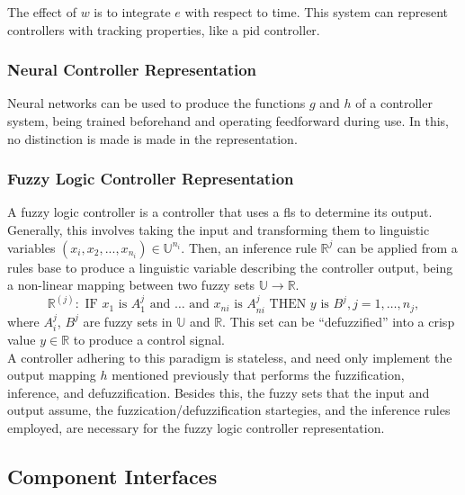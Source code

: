 The effect of $w$ is to integrate $e$ with respect to time. This system can represent controllers with tracking
properties, like a \acrshort{pid} controller.

\subsubsection{Neural Controller Representation}\label{sec:nnc}

Neural networks can be used to produce the functions $g$ and $h$ of a controller system, being trained 
beforehand and operating feedforward during use. In this, no distinction is made is made in the representation. \\

\subsubsection{Fuzzy Logic Controller Representation}\label{sec:flc}

A fuzzy logic controller is a controller that uses a \acrlong{fls} to determine its output. Generally, this involves 
taking the input and transforming them to linguistic variables $(x_i, x_2, ..., x_{n_i}) \in \mathbb U^{n_i}$. Then, 
an inference rule $\mathbb R^j$ can be applied from a rules base to produce a linguistic variable describing 
the controller output, being a non-linear mapping between two fuzzy sets $\mathbb U \rightarrow \mathbb R$. 
\begin{equation}
\mathbb{R}^{(j)}:\text{ IF }x_{1}\text{ is }A_{1}^{j}\text{ and }\ldots\text{ and }x_{n i}\text{ is }A_{n i}^{j}\text{ THEN }y\text{ is }B^{j}, j=1, \ldots, n_{j},
\end{equation}
where $A_i^j$, $B^j$ are fuzzy sets in $\mathbb U$ and $\mathbb R$. This set can be ``defuzzified'' into a crisp value $y \in \mathbb R$ to produce a control signal. \\

A controller adhering to this paradigm is stateless, and need only implement the output mapping $h$
mentioned previously that performs the fuzzification, inference, and defuzzification. Besides this, the fuzzy 
sets that the input and output assume, the fuzzication/defuzzification startegies, and the inference rules employed, are necessary for the fuzzy logic controller representation.

\subsection{Component Interfaces}

